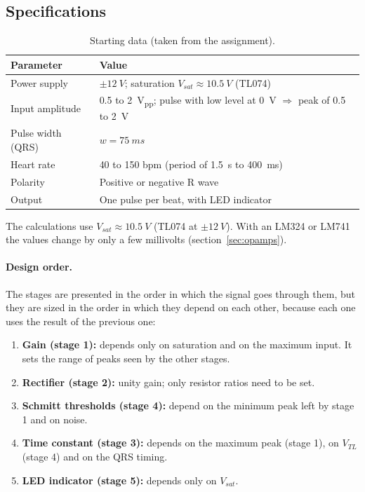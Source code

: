 \documentclass[11pt,letterpaper]{article}
\newcommand{\VTL}{V_{TL}}
\newcommand{\Vsat}{V_{sat}}
\begin{document}
\subsection{Specifications}

\begin{table}[H]
\centering
\caption{Starting data (taken from the assignment).}\label{tab:specs}
\begin{tabularx}{\linewidth}{@{}lX@{}}
\toprule
Parameter & Value \\
\midrule
Power supply & $\pm\SI{12}{V}$; saturation $\Vsat\approx\SI{10.5}{V}$ (TL074) \\
Input amplitude & 0.5 to \SI{2}{V_{pp}}; pulse with low level at \SI{0}{V} $\Rightarrow$ peak of 0.5 to \SI{2}{V} \\
Pulse width (QRS) & $w=\SI{75}{ms}$ \\
Heart rate & 40 to 150 bpm (period of \SI{1.5}{s} to \SI{400}{ms}) \\
Polarity & Positive or negative R wave \\
Output & One pulse per beat, with LED indicator \\
\bottomrule
\end{tabularx}
\end{table}

The calculations use $\Vsat\approx\SI{10.5}{V}$ (TL074 at $\pm\SI{12}{V}$). With an LM324 or LM741 the values change by only a few millivolts (section~\ref{sec:opamps}).

\paragraph{Design order.} The stages are presented in the order in which the signal goes through them, but they are sized in the order in which they depend on each other, because each one uses the result of the previous one:
\begin{enumerate}
  \item \textbf{Gain (stage 1):} depends only on saturation and on the maximum input. It sets the range of peaks seen by the other stages.
  \item \textbf{Rectifier (stage 2):} unity gain; only resistor ratios need to be set.
  \item \textbf{Schmitt thresholds (stage 4):} depend on the minimum peak left by stage 1 and on noise.
  \item \textbf{Time constant (stage 3):} depends on the maximum peak (stage 1), on $\VTL$ (stage 4) and on the QRS timing.
  \item \textbf{LED indicator (stage 5):} depends only on $\Vsat$.
\end{enumerate}
\end{document}
